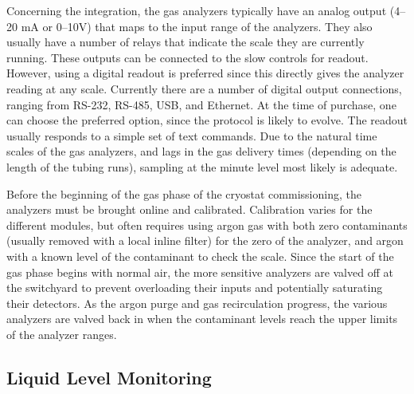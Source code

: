 Concerning the integration, the gas analyzers typically have an analog output (\numrange{4}{20} \si{mA} or \numrange{0}{10}\si{V}) that maps to the input range of the analyzers. They also usually have a number of relays that indicate the scale they are currently running. These outputs can be connected to the slow controls for readout. However, using a digital readout is preferred since this directly gives the analyzer reading at any scale. Currently there are a number of digital output connections, ranging from RS-232, RS-485, USB, and Ethernet. At the time of purchase, one can choose the preferred option, since the protocol is likely to evolve. The readout usually responds to a simple set of text commands. Due to the natural time scales of the gas analyzers, and lags in the gas delivery times (depending on the length of the tubing runs), sampling at the minute level most likely is adequate. 

Before the beginning of the gas phase of the cryostat commissioning, the analyzers must be brought online and calibrated. Calibration varies for the different modules, but often requires using argon gas with both zero contaminants (usually removed with a local inline filter) for the zero of the analyzer, and argon with a known level of the contaminant to check the scale. Since the start of the gas phase  begins with normal air, the more sensitive analyzers are valved off at the switchyard to prevent overloading their inputs and potentially saturating their detectors. As the argon purge and gas recirculation progress, the various analyzers are valved back in when the contaminant levels reach the upper limits of the analyzer ranges. 

\subsection{Liquid Level Monitoring}
\label{sec:fdgen-slow-cryo-install-llm}

